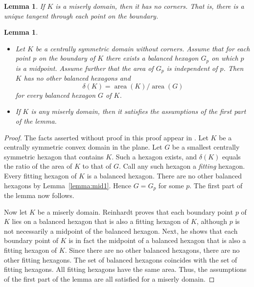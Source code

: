 \documentclass[11pt]{amsart}
\newtheorem{lemma}[equation]{Lemma}
\def\op#1{{\operatorname{#1}}}
\def\deltalat{\mathbb\delta}  %
\def\aa{{\op{area}}}
\begin{document}
\begin{lemma}\label{lemma:221} 
  If $K$ is a miserly domain, then it has no corners.  That is, there
  is a unique tangent through each point on the boundary.
  \cite[p.221]{R}
\end{lemma}

\begin{lemma}\label{lemma:mid-min} %
\begin{itemize}
\item Let $K$ be a centrally symmetric domain without corners.  Assume
  that for each point $p$ on the boundary of $K$ there exists a
  balanced hexagon $G_p$ on which $p$ is a midpoint.  Assume further
  that the area of $G_p$ is independent of $p$.  Then $K$ has no
  other balanced hexagons and
\begin{equation}\label{eqn:density}
\deltalat(K) = \aa(K)/\aa(G)
\end{equation}
for every balanced hexagon $G$ of $K$.
\item If $K$ is any miserly domain, then it satisfies the assumptions of the first part of the lemma.
\end{itemize}
\end{lemma}
%
\begin{proof} The facts asserted without proof in this proof appear in
  \cite[pp.219--222]{R}.  Let $K$ be a centrally symmetric convex
  domain in the plane.  Let $G$ be a smallest centrally symmetric
  hexagon that contains $K$.  Such a hexagon exists, and
  $\deltalat(K)$ equals the ratio of the area of $K$ to that of
  $G$. %
  Call any such hexagon a {\it fitting} hexagon.  Every fitting hexagon of
  $K$ is a balanced hexagon. %
  There are no other balanced hexagons by Lemma~\ref{lemma:mid1}.
  Hence $G=G_p$ for some $p$.  The first part of the lemma now follows.

  Now let $K$ be a miserly domain.  Reinhardt proves that each
  boundary point $p$ of $K$ lies on a balanced hexagon that is also a
  fitting hexagon of $K$, although $p$ is not necessarily a midpoint
  of the balanced hexagon.  %
  Next, he shows that each boundary point of $K$ is in fact the
  midpoint of a balanced hexagon that is also a fitting hexagon of
  $K$. %
  Since there are no other balanced hexagons, there are no other
  fitting hexagons.  The set of balanced hexagons coincides with the
  set of fitting hexagons.  All fitting hexagons have the same area.
  Thus, the assumptions of the first part of the lemma are all
  satisfied for a miserly domain.
\end{proof}
\end{document}
